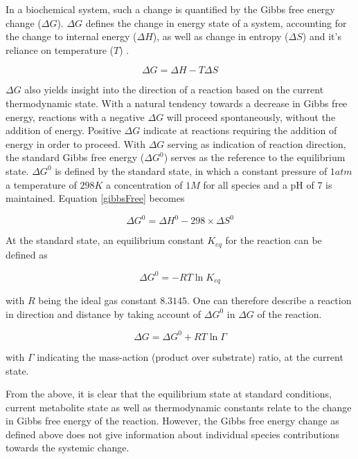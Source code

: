 In a biochemical system, such a change is quantified by the Gibbs free energy change ($\Delta G$). $\Delta G$ defines the change in energy state of a system, accounting for the change to internal energy ($\Delta H$), as well as change in entropy ($\Delta S$) and it's reliance on temperature ($T$) \cite{Job2016, LEFFLER1955}.

\begin{equation}\label{gibbsFree}
\Delta G = \Delta H - T \Delta S
\end{equation}

$\Delta G$ also yields insight into the direction of a reaction based on the current thermodynamic state. With a natural tendency towards a decrease in Gibbs free energy, reactions with a negative $\Delta G$ will proceed spontaneously, without the addition of energy. Positive $\Delta G$ indicate at reactions requiring the addition of energy in order to proceed.  With $\Delta G$  serving as indication of reaction direction, the standard Gibbs free energy ($\Delta G^0$) serves as the reference to the equilibrium state. $\Delta G^0$ is defined by the standard state, in which a constant pressure of $1atm$ a temperature of $298K$ a concentration of $1M$ for all species and a pH of 7 is maintained. Equation \ref{gibbsFree} becomes

\begin{equation}
\Delta G^0 = \Delta H^0 - 298 \times \Delta S^0  
\end{equation}

At the standard state, an equilibrium constant $K_{eq}$ for the reaction can be defined as

\begin{equation}
\Delta G^0 = -RT \ln K_{eq}  
\end{equation}

with $R$ being the ideal gas constant $8.3145$. One can therefore describe a reaction in direction and distance by taking account of $\Delta G^0$ in $\Delta G$ of the reaction.

\begin{equation}\label{mass_action}
\Delta G = \Delta G^0 + RT \ln \Gamma
\end{equation}

with $\Gamma$ indicating the mass-action (product over substrate) ratio, at the current state.

From the above, it is clear that the equilibrium state at standard conditions, current metabolite state as well as thermodynamic constants relate to the change in Gibbs free energy of the reaction. However, the Gibbs free energy change as defined above does not give information about individual species contributions towards the systemic change.

